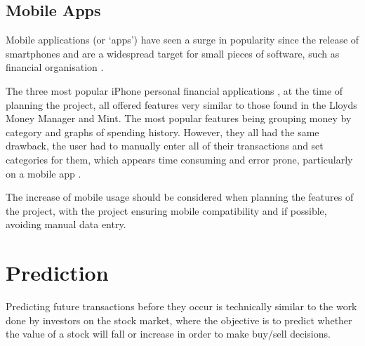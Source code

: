 \subsection{Mobile Apps}
Mobile applications (or `apps') have seen a surge in popularity since the release of smartphones and are a widespread target for small pieces of software, such as financial organisation \parencite{purcell2011half}.

The three most popular iPhone personal financial applications \cite{itunes2013topapps}, at the time of planning the project, all offered features very similar to those found in the Lloyds Money Manager and Mint. The most popular features being grouping money by \gls{category} and graphs of spending history.
% 
However, they all had the same drawback, the user had to manually enter all of their transactions and set categories for them, which appears time consuming and error prone, particularly on a mobile app \cite{spendee2014spendee,budgt2013budgt,bluetags2014pocket}.

The increase of mobile usage should be considered when planning the features of the project, with the project ensuring mobile compatibility and if possible, avoiding manual data entry. 

\section{Prediction}
Predicting future transactions before they occur is technically similar to the work done by investors on the stock market, where the objective is to predict whether the value of a stock will fall or increase in order to make buy/sell decisions.

